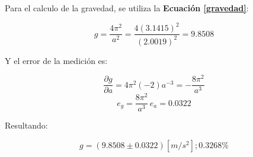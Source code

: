 \documentclass[letter,11pt]{article}
\begin{document}
Para el calculo de la gravedad, se utiliza la \textbf{Ecuación \ref{gravedad}}:

\begin{equation*}
    g = \frac{4 \pi^2}{a^2} = \frac{4(3.1415)^2}{(2.0019)^2} = 9.8508
\end{equation*}
\vspace{0.10cm}

Y el error de la medición es:

\begin{equation*}
    \frac{\partial g}{\partial a} = 4 \pi^2 (-2) a^{-3} = -\frac{8\pi^2}{a^3}
\end{equation*}
\begin{equation*}
    e_g = \frac{8 \pi^2}{a^3}\,e_a = 0.0322
\end{equation*}
\vspace{0.10cm}

Resultando:

\begin{equation*}
    g = (9.8508 \pm 0.0322) [m/s^2]; 0.3268\%
\end{equation*}
\vspace{0.10cm}
\end{document}
